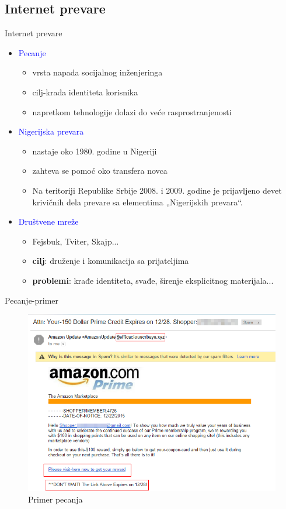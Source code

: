 \documentclass{beamer}
\begin{document}
		\subsection*{Internet prevare}
			\begin{frame}{Internet prevare}
				\begin{itemize}
					\item \textcolor{blue}{Pecanje}
						\begin{itemize}
							\item vrsta napada socijalnog inženjeringa
							\item cilj-krađa identiteta korisnika
							\item napretkom tehnologije dolazi do veće rasprostranjenosti
						\end{itemize}
					\item\textcolor{blue}{Nigerijska prevara}
						\begin{itemize}
							\item nastaje oko 1980. godine u Nigeriji
							\item zahteva se pomoć oko transfera novca
							\item Na teritoriji Republike Srbije 2008. i 2009. godine je prijavljeno devet krivičnih dela prevare sa elementima „Nigerijskih prevara“.
						\end{itemize}
					\item \textcolor{blue}{Društvene mreže}
						\begin{itemize}
							\item Fejsbuk, Tviter, Skajp...
							\item \textbf{cilj}: druženje i komunikacija sa prijateljima
							\item\textbf{problemi}: krađe identiteta, svađe, širenje eksplicitnog materijala...
						\end{itemize}
					\end{itemize}
			\end{frame}
			\begin{frame}{Pecanje-primer}
			\begin{figure}[h!]
				\begin{center}
					\includegraphics[scale=0.25]{phishing_amazon.png}
				\end{center}
				\caption{Primer pecanja }
				\label{fig:phishing}
			\end{figure}
			\end{frame}
\end{document}
